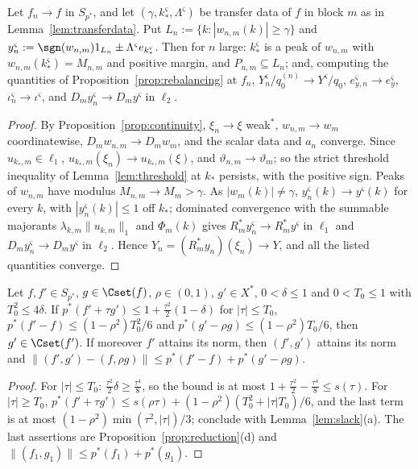\begin{lemma}\label{lem:persistence}
Let $f_n\to f$ in $S_{p^*}$, and let $(\gamma,k_*^\varsigma,\Lambda^\varsigma)$
be transfer data of $f$ in block $m$ as in Lemma~\ref{lem:transferdata}.  Put
$L_n:=\{k:|w_{n,m}(k)|\ge\gamma\}$ and $y_n^\varsigma:=\sgn(w_{n,m})1_{L_n}
\pm\Lambda^\varsigma e_{k^\varsigma_*}$.  Then for $n$ large: $k_*^\varsigma$
is a peak of $w_{n,m}$ with $w_{n,m}(k_*^\varsigma)=M_{n,m}$ and positive
margin, and $P_{n,m}\subseteq L_n$; and, computing the quantities of
Proposition~\ref{prop:rebalancing} at $f_n$,
$Y^\varsigma_n/q^{(n)}_0\to Y^\varsigma/q_0$, $e^\varsigma_{y,n}\to
e^\varsigma_y$, $\iota^\varsigma_n\to\iota^\varsigma$, and
$D_my^\varsigma_n\to D_my^\varsigma$ in $\ell_2$.
\end{lemma}

\begin{proof}
By Proposition~\ref{prop:continuity}, $\xi_n\to\xi$ weak$^*$, $w_{n,m}\to
w_m$ coordinatewise, $D_mw_{n,m}\to D_mw_m$, and the scalar data and $a_n$
converge.  Since $u_{k_*,m}\in\ell_1$, $u_{k_*,m}(\xi_n)\to u_{k_*,m}(\xi)$,
and $\vartheta_{n,m}\to\vartheta_m$; so the strict threshold inequality of
Lemma~\ref{lem:threshold} at $k_*$ persists, with the positive sign.  Peaks
of $w_{n,m}$ have modulus $M_{n,m}\to M_m>\gamma$.  As $|w_m(k)|\ne\gamma$,
$y^\varsigma_n(k)\to y^\varsigma(k)$ for every $k$, with $|y_n^\varsigma(k)|\le1$
off $k_*$; dominated convergence with the summable majorants
$\lambda_{k,m}\|u_{k,m}\|_1$ and $\Phi_m(k)$ gives
$R_m^*y_n^\varsigma\to R_m^*y^\varsigma$ in $\ell_1$ and
$D_my^\varsigma_n\to D_my^\varsigma$ in $\ell_2$.  Hence
$Y_n=(R_m^*y_n)(\xi_n)\to Y$, and all the listed quantities converge.
\end{proof}

\begin{lemma}[Assembly]\label{lem:assembly}
Let $f,f'\in S_{p^*}$, $g\in\Cset(f)$, $\rho\in(0,1)$, $g'\in X^*$,
$0<\delta\le1$ and $0<T_0\le1$ with $T_0^2\le4\delta$.  If
$p^*(f'+\tau g')\le1+\frac{\tau^2}2(1-\delta)$ for $|\tau|\le T_0$,
$p^*(f'-f)\le(1-\rho^2)T_0^2/6$ and $p^*(g'-\rho g)\le(1-\rho^2)T_0/6$, then
$g'\in\Cset(f')$.  If moreover $f'$ attains its norm, then $(f',g')$
attains its norm and $\|(f',g')-(f,\rho g)\|\le p^*(f'-f)+p^*(g'-\rho g)$.
\end{lemma}

\begin{proof}
For $|\tau|\le T_0$: $\frac{\tau^2}2\delta\ge\frac{\tau^4}8$, so the bound is
at most $1+\frac{\tau^2}2-\frac{\tau^4}8\le s(\tau)$.  For $|\tau|\ge T_0$,
$p^*(f'+\tau g')\le s(\rho\tau)+(1-\rho^2)(T_0^2+|\tau|T_0)/6$, and the last
term is at most $(1-\rho^2)\min(\tau^2,|\tau|)/3$; conclude with
Lemma~\ref{lem:slack}(a).  The last assertions are
Proposition~\ref{prop:reduction}(d) and $\|(f_1,g_1)\|\le p^*(f_1)+p^*(g_1)$.
\end{proof}
